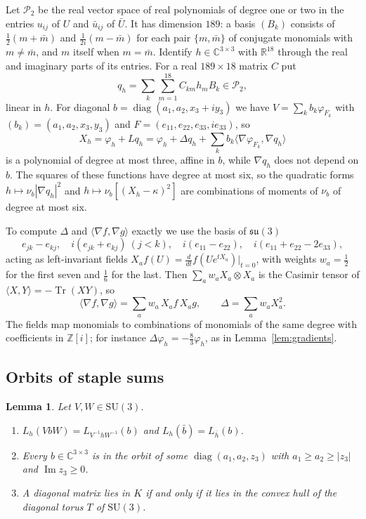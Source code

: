 \documentclass[11pt]{amsart}
\newtheorem{lemma}[theorem]{Lemma}
\theoremstyle{definition}
\theoremstyle{remark}
\numberwithin{equation}{section}
\newcommand{\R}{\mathbb{R}}
\newcommand{\Z}{\mathbb{Z}}
\newcommand{\C}{\mathbb{C}}
\newcommand{\SU}{\mathrm{SU}}
\newcommand{\Tr}{\operatorname{Tr}}
\newcommand{\ip}[2]{\langle #1,#2\rangle}
\begin{document}
Let $\mathcal P_2$ be the real vector space of real polynomials of degree one
or two in the entries $u_{ij}$ of $U$ and $\bar u_{ij}$ of $\bar U$. It has
dimension $189$: a basis $(B_k)$ consists of $\frac12(m+\bar m)$ and
$\frac1{2i}(m-\bar m)$ for each pair $\{m,\bar m\}$ of conjugate monomials with
$m\ne\bar m$, and $m$ itself when $m=\bar m$. Identify $h\in\C^{3\times3}$
with $\R^{18}$ through the real and imaginary parts of its entries. For a real
$189\times18$ matrix $C$ put
\[
q_h=\sum_{k}\sum_{m=1}^{18}C_{km}h_mB_k\in\mathcal P_2 ,
\]
linear in $h$. For diagonal $b=\operatorname{diag}(a_1,a_2,x_3+iy_3)$ we have
$V=\sum_kb_k\varphi_{F_k}$ with $(b_k)=(a_1,a_2,x_3,y_3)$ and $F=(e_{11},e_{22},
e_{33},ie_{33})$, so
\begin{equation}\label{eq:Xq}
X_h=\varphi_h+Lq_h=\varphi_h+\Delta q_h+\sum_kb_k\ip{\nabla\varphi_{F_k}}
{\nabla q_h}
\end{equation}
is a polynomial of degree at most three, affine in $b$, while $\nabla q_h$
does not depend on $b$. The squares of these functions have degree at most
six, so the quadratic forms $h\mapsto\nu_b|\nabla q_h|^2$ and
$h\mapsto\nu_b[(X_h-\kappa)^2]$ are combinations of moments of $\nu_b$ of
degree at most six.

To compute $\Delta$ and $\ip{\nabla f}{\nabla g}$ exactly we use the basis of
$\mathfrak{su}(3)$
\[
e_{jk}-e_{kj},\quad i(e_{jk}+e_{kj})\ (j<k),\quad i(e_{11}-e_{22}),\quad
i(e_{11}+e_{22}-2e_{33}),
\]
acting as left-invariant fields $X_af(U)=\frac d{dt}f(Ue^{tX_a})|_{t=0}$, with
weights $w_a=\frac12$ for the first seven and $\frac16$ for the last. Then
$\sum_aw_aX_a\otimes X_a$ is the Casimir tensor of $\ip XY=-\Tr(XY)$, so
\[
\ip{\nabla f}{\nabla g}=\sum_aw_a\,X_af\,X_ag,\qquad\Delta=\sum_aw_aX_a^2 .
\]
The fields map monomials to combinations of monomials of the same degree with
coefficients in $\Z[i]$; for instance $\Delta\varphi_h=-\frac83\varphi_h$, as in
Lemma~\ref{lem:gradients}.

\subsection{Orbits of staple sums}

\begin{lemma}\label{lem:orbits}
Let $V,W\in\SU(3)$.
\begin{enumerate}[label=\textup{(\roman*)},leftmargin=*]
\item $L_h(VbW)=L_{V^{-1}hW^{-1}}(b)$ and $L_h(\bar b)=L_{\bar h}(b)$.
\item Every $b\in\C^{3\times3}$ is in the orbit of some
$\operatorname{diag}(a_1,a_2,z_3)$ with $a_1\ge a_2\ge|z_3|$ and
$\operatorname{Im}z_3\ge0$.
\item A diagonal matrix lies in $K$ if and only if it lies in the convex hull
of the diagonal torus $T$ of $\SU(3)$.
\end{enumerate}
\end{lemma}
\end{document}

